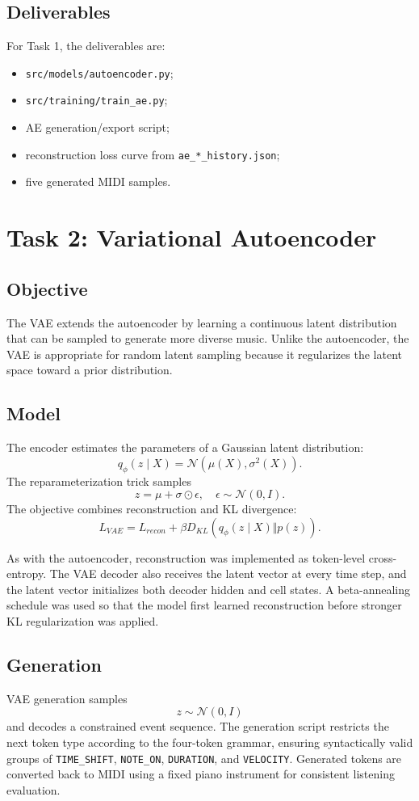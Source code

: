 \documentclass{article}
\begin{document}
\subsection{Deliverables}
For Task 1, the deliverables are:
\begin{itemize}[leftmargin=*]
    \item \texttt{src/models/autoencoder.py};
    \item \texttt{src/training/train\_ae.py};
    \item AE generation/export script;
    \item reconstruction loss curve from \texttt{ae\_*\_history.json};
    \item five generated MIDI samples.
\end{itemize}

\section{Task 2: Variational Autoencoder}

\subsection{Objective}
The VAE extends the autoencoder by learning a continuous latent distribution that can be sampled to generate more diverse music. Unlike the autoencoder, the VAE is appropriate for random latent sampling because it regularizes the latent space toward a prior distribution.

\subsection{Model}
The encoder estimates the parameters of a Gaussian latent distribution:
\[
q_{\phi}(z \mid X) = \mathcal{N}(\mu(X), \sigma^2(X)).
\]
The reparameterization trick samples
\[
z = \mu + \sigma \odot \epsilon, \quad \epsilon \sim \mathcal{N}(0, I).
\]
The objective combines reconstruction and KL divergence:
\[
L_{VAE} = L_{recon} + \beta D_{KL}(q_{\phi}(z \mid X) \Vert p(z)).
\]

As with the autoencoder, reconstruction was implemented as token-level cross-entropy. The VAE decoder also receives the latent vector at every time step, and the latent vector initializes both decoder hidden and cell states. A beta-annealing schedule was used so that the model first learned reconstruction before stronger KL regularization was applied.

\subsection{Generation}
VAE generation samples
\[
z \sim \mathcal{N}(0, I)
\]
and decodes a constrained event sequence. The generation script restricts the next token type according to the four-token grammar, ensuring syntactically valid groups of \texttt{TIME\_SHIFT}, \texttt{NOTE\_ON}, \texttt{DURATION}, and \texttt{VELOCITY}. Generated tokens are converted back to MIDI using a fixed piano instrument for consistent listening evaluation.
\end{document}
